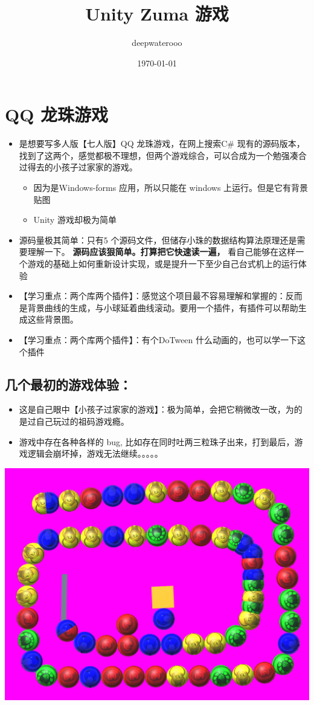 \documentclass[9pt, b5paper]{article}
\author{deepwaterooo}
\date{\today}
\title{Unity Zuma 游戏}
\begin{document}
\maketitle
\tableofcontents


\section{QQ 龙珠游戏}
\label{sec-1}
\begin{itemize}
\item 是想要写多人版【七人版】QQ 龙珠游戏，在网上搜索C\# 现有的源码版本，找到了这两个，感觉都极不理想，但两个游戏综合，可以合成为一个勉强凑合过得去的小孩子过家家的游戏。
\begin{itemize}
\item 因为是Windows-forms 应用，所以只能在 windows 上运行。但是它有背景贴图
\item Unity 游戏却极为简单
\end{itemize}
\item 源码量极其简单：只有5 个源码文件，但储存小珠的数据结构算法原理还是需要理解一下。 \textbf{源码应该狠简单。打算把它快速读一遍，} 看自己能够在这样一个游戏的基础上如何重新设计实现，或是提升一下至少自己台式机上的运行体验
\item 【学习重点：两个库两个插件】：感觉这个项目最不容易理解和掌握的：反而是背景曲线的生成，与小球延着曲线滚动。要用一个插件，有插件可以帮助生成这些背景图。
\item 【学习重点：两个库两个插件】：有个DoTween 什么动画的，也可以学一下这个插件
\end{itemize}
\subsection{几个最初的游戏体验：}
\label{sec-1-1}
\begin{itemize}
\item 这是自己眼中【小孩子过家家的游戏】：极为简单，会把它稍微改一改，为的是过自己玩过的祖码游戏瘾。
\item 游戏中存在各种各样的 bug, 比如存在同时吐两三粒珠子出来，打到最后，游戏逻辑会崩坏掉，游戏无法继续。。。。。
\end{itemize}

\includegraphics[width=.9\linewidth]{./pic/readme_20230323_112732.png}
\end{document}

